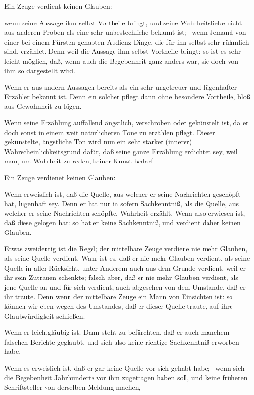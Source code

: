 \begin{aufza}
\item Ein  Zeuge verdient keinen Glauben:
\begin{aufzb}
\item wenn seine Aussage ihm selbst Vortheile bringt, und seine Wahrheitsliebe nicht aus anderen Proben als eine sehr unbestechliche bekannt ist; \zB\ wenn Jemand von einer bei einem Fürsten gehabten Audienz Dinge, die für ihn selbst sehr rühmlich sind, erzählet. Denn weil die Aussage ihm selbst Vortheile bringt: so ist es sehr leicht möglich, daß, wenn auch die Begebenheit ganz anders war, sie doch von ihm so dargestellt wird.
\item Wenn er aus andern Aussagen bereits als ein sehr ungetreuer und lügenhafter Erzähler bekannt ist. Denn ein solcher pflegt dann ohne besondere Vortheile, bloß aus Gewohnheit zu lügen.
\item Wenn seine Erzählung auffallend ängstlich, verschroben oder gekünstelt ist, da er doch sonst in einem weit natürlicheren Tone zu erzählen pflegt. Dieser gekünstelte, ängstliche Ton wird nun ein sehr starker (innerer) Wahrscheinlichkeitsgrund dafür, daß seine ganze Erzählung erdichtet sey, weil man, um Wahrheit zu reden, keiner Kunst bedarf.
\end{aufzb}
\item Ein  Zeuge verdienet keinen Glauben:
\begin{aufzb}
\item Wenn erweislich ist, daß die Quelle, aus welcher er seine Nachrichten geschöpft hat, lügenhaft sey. Denn er hat nur in sofern Sachkenntniß, als die Quelle, aus welcher er seine Nachrichten schöpfte, Wahrheit erzählt. Wenn also erwiesen ist, daß diese gelogen hat: so hat er keine Sachkenntniß, und verdient daher keinen Glauben.
\begin{RWanm}
Etwas zweideutig ist die Regel; der mittelbare Zeuge verdiene nie mehr Glauben, als seine Quelle verdient. Wahr ist es, daß er nie mehr Glauben verdient, als seine Quelle in aller Rücksicht, unter Anderem auch aus dem Grunde verdient, weil er ihr sein Zutrauen schenkte; falsch aber, daß er nie mehr Glauben verdient, als jene Quelle an und für sich verdient, auch abgesehen von dem Umstande, daß er ihr traute. Denn wenn der mittelbare Zeuge ein Mann von Einsichten ist: so können wir eben wegen des Umstandes, daß er dieser Quelle traute, auf ihre Glaubwürdigkeit schließen.
\end{RWanm}
\item Wenn er leichtgläubig ist. Dann steht zu befürchten, daß er auch manchem falschen Berichte geglaubt, und sich also keine richtige Sachkenntniß erworben habe.
\item Wenn es erweislich ist, daß er gar keine Quelle vor sich gehabt habe; \zB\ wenn sich die Begebenheit Jahrhunderte vor ihm zugetragen haben soll, und keine früheren Schriftsteller von derselben Meldung machen, \usw
\end{aufzb}
\end{aufza}

